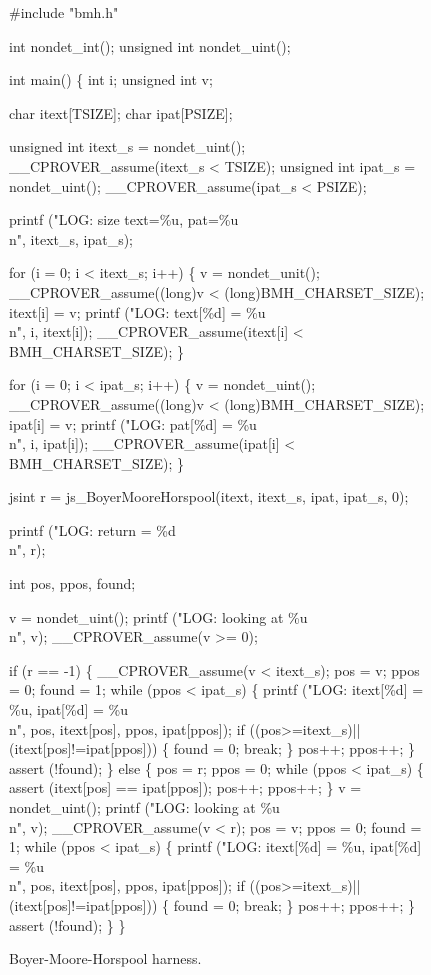 \documentclass[conference]{IEEEtran}
\begin{document}
\begin{figure}
{\scriptsize
\begin{code}
\#include "bmh.h"

int nondet\_int();
unsigned int nondet\_uint();

int main() \{
  int i;
  unsigned int v;

  char itext[TSIZE];
  char ipat[PSIZE];

  unsigned int itext\_s = nondet\_uint();
  \_\_CPROVER\_assume(itext\_s < TSIZE);
  unsigned int ipat\_s = nondet\_uint();
  \_\_CPROVER\_assume(ipat\_s < PSIZE);

  printf ("LOG: size text=\%u, pat=\%u\\n", itext\_s, ipat\_s);

  for (i = 0; i < itext\_s; i++) \{
    v = nondet\_unit();
    \_\_CPROVER\_assume((long)v < (long)BMH\_CHARSET\_SIZE);
    itext[i] = v;
    printf ("LOG: text[\%d] = \%u\\n", i, itext[i]);
    \_\_CPROVER\_assume(itext[i] < BMH\_CHARSET\_SIZE);
  \}

  for (i = 0; i < ipat\_s; i++) \{
    v = nondet\_uint();
    \_\_CPROVER\_assume((long)v < (long)BMH\_CHARSET\_SIZE);
    ipat[i] = v;
    printf ("LOG: pat[\%d] = \%u\\n", i, ipat[i]);
    \_\_CPROVER\_assume(ipat[i] < BMH\_CHARSET\_SIZE);
  \}

  jsint r = js\_BoyerMooreHorspool(itext, itext\_s, 
                ipat, ipat\_s, 0);

  printf ("LOG: return = \%d\\n", r);
  
  int pos, ppos, found;

  v = nondet\_uint();
  printf ("LOG: looking at \%u\\n", v);
  \_\_CPROVER\_assume(v >= 0);
  
  if (r == -1) \{
    \_\_CPROVER\_assume(v < itext\_s);
    pos = v; ppos = 0; found = 1;
    while (ppos < ipat\_s) \{
      printf ("LOG: itext[\%d] = \%u, ipat[\%d] = \%u\\n",
                 pos, itext[pos], ppos, ipat[ppos]);      
      if ((pos>=itext\_s)||(itext[pos]!=ipat[ppos])) \{
	found = 0;
	break;
      \}
      pos++; ppos++;
    \}
    assert (!found);
  \} else \{
    pos = r; ppos = 0;
    while (ppos < ipat\_s) \{
      assert (itext[pos] == ipat[ppos]);
      pos++; ppos++;
    \}
    v = nondet\_uint();
    printf ("LOG: looking at \%u\\n", v);
    \_\_CPROVER\_assume(v < r);
    pos = v; ppos = 0; found = 1;
    while (ppos < ipat\_s) \{
      printf ("LOG: itext[\%d] = \%u, ipat[\%d] = \%u\\n",
                 pos, itext[pos], ppos, ipat[ppos]);
      if ((pos>=itext\_s)||(itext[pos]!=ipat[ppos])) \{
	found = 0;
	break;
      \}
      pos++; ppos++;
    \}
    assert (!found);
  \}
\}
\end{code}
}
\caption{Boyer-Moore-Horspool harness.}
\label{fig:bmhharn}
\end{figure}
\end{document}
